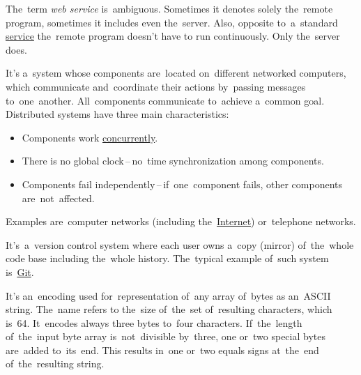 \warning The~term \textit{web service} is~ambiguous. Sometimes it denotes solely the~remote program, sometimes it includes even the~server. Also, opposite to~a~standard \hyperref[applicationprocessprogramservicethread]{service} the~remote program doesn't have to run continuously. Only the~server does.

\label{distributedsystem}
It's a~system whose components are~located on~different networked computers, which communicate and~coordinate their actions by~passing messages to~one~another. All~components communicate to~achieve a~common goal. Distributed systems have three main characteristics:
\begin{itemize}
    \item Components work \hyperref[concurrency]{concurrently}.
    \item There is no global clock\,--\,no~time synchronization among components.
    \item Components fail independently\,--\,if~one~component fails, other components are~not~affected.
\end{itemize}
\noindent Examples are~computer networks (including the~\hyperref[internetweb]{Internet}) or~telephone networks.

\label{distributedversioncontrolsystem}
It's~a~version control system where each user owns a~copy (mirror) of~the~whole code base including the~whole history. The~typical example of~such system is~\hyperref[git]{Git}.


\label{concurrency}

\label{loosetightcoupling}

\label{base64}
It's an~encoding used for~representation of~any array of~bytes as an~ASCII string. The~name refers to the~size of~the~set of~resulting characters, which is~64. It~encodes always three bytes to~four characters. If~the~length of~the~input byte array is~not~divisible by~three, one or~two special bytes are~added to~its~end. This results in~one or~two equals signs at~the~end of~the~resulting string.
